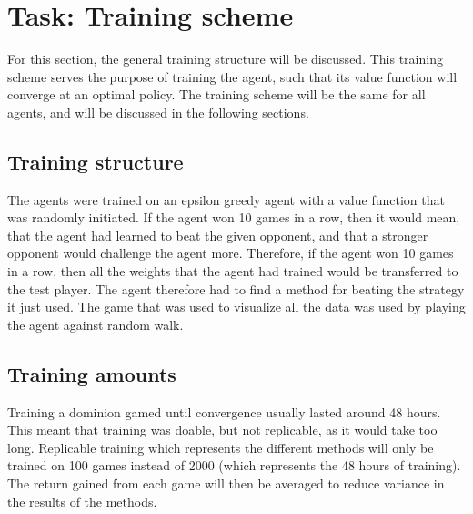 \chapter{Task: Training scheme} \label{ch:Dominion_engine}
For this section, the general training structure will be discussed. This training scheme serves the purpose of training the agent, such that its value function will converge at an optimal policy. The training scheme will be the same for all agents, and will be discussed in the following sections.

\section{Training structure}
The agents were trained on an epsilon greedy agent with a value function that was randomly initiated. If the agent won 10 games in a row, then it would mean, that the agent had learned to beat the given opponent, and that a stronger opponent would challenge the agent more. Therefore, if the agent won 10 games in a row, then all the weights that the agent had trained would be transferred to the test player. The agent therefore had to find a method for beating the strategy it just used. The game that was used to visualize all the data was used by playing the agent against random walk.



\section{Training amounts}
Training a dominion gamed until convergence usually lasted around 48 hours. This meant that training was doable, but not replicable, as it would take too long. Replicable training which represents the different methods will only be trained on 100 games instead of 2000 (which represents the 48 hours of training). The return gained from each game will then be averaged to reduce variance in the results of the methods.